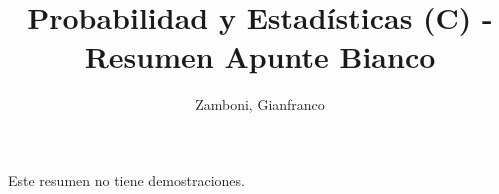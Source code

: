 

\title{Probabilidad y Estadísticas (C) - Resumen Apunte Bianco}

\author{Zamboni, Gianfranco}





\begin{titlepage}
    \maketitle
    \thispagestyle{empty}
    \tableofcontents
\end{titlepage}
 Este resumen no tiene demostraciones.



